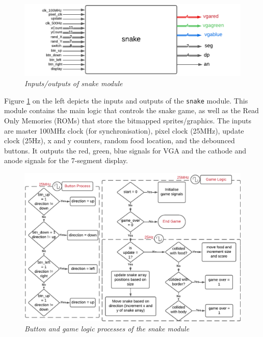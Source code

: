 \documentclass[aps, secnumarabic, balancelastpage, asmath, amssymb, nofootinbib, floatfix,]{revtex4-2}
\begin{document}
{\vspace{-1.5em}
\begin{figure}
    \centering
    \includegraphics[scale = 0.8]{VGA-Flow - Page 1-1.pdf}
    \caption{\em Inputs/outputs of snake module}
    \label{fig:2}
\end{figure}

Figure \ref{fig:2} on the left depicts the inputs and outputs of the \verb|snake| module. This module contains the main logic that controls the snake game, as well as the Read Only Memories (ROMs) that store the bitmapped sprites/graphics. The inputs are master 100MHz clock (for synchronisation), pixel clock (25MHz), update clock (25Hz), x and y counters, random food location, and the debounced buttons. It outputs the red, green, blue signals for VGA and the cathode and anode signals for the 7-segment display. 


\begin{figure}[h]
  \centering
  \includegraphics[scale = 0.72]{logic.pdf}
  \caption{\em Button and game logic processes of the snake module}
  \label{fig:3}
\end{figure}

\clearpage

}
\end{document}

